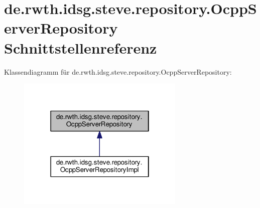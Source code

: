 \hypertarget{interfacede_1_1rwth_1_1idsg_1_1steve_1_1repository_1_1_ocpp_server_repository}{\section{de.\-rwth.\-idsg.\-steve.\-repository.\-Ocpp\-Server\-Repository Schnittstellenreferenz}
\label{interfacede_1_1rwth_1_1idsg_1_1steve_1_1repository_1_1_ocpp_server_repository}
}


Klassendiagramm für de.\-rwth.\-idsg.\-steve.\-repository.\-Ocpp\-Server\-Repository\-:
\nopagebreak
\begin{figure}[H]
\begin{center}
\leavevmode
\includegraphics[width=226pt]{interfacede_1_1rwth_1_1idsg_1_1steve_1_1repository_1_1_ocpp_server_repository__inherit__graph}
\end{center}
\end{figure}
